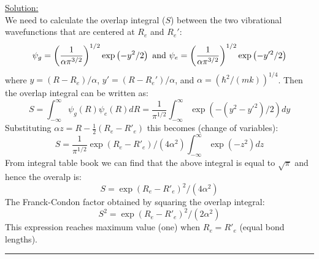 \noindent
\underline{Solution:}\\

\noindent
We need to calculate the overlap integral ($S$) between the two vibrational wavefunctions that are centered at $R_e$ and $R_e'$:
$$\psi_g = \left(\frac{1}{\alpha\pi^{3/2}}\right)^{1/2}\exp\left(-y^2/2\right)\textnormal{ and }\psi_e = \left(\frac{1}{\alpha\pi^{3/2}}\right)^{1/2}\exp\left(-y'^2/2\right)$$
where $y = (R - R_e)/\alpha$, $y' = (R - R_e')/\alpha$, and $\alpha = \left(\hbar^2/(mk)\right)^{1/4}$. Then the overlap integral
can be written as:
$$S = \int_{-\infty}^{\infty}\psi_g(R)\psi_e(R)dR = \frac{1}{\pi^{1/2}}\int_{-\infty}^{\infty}\exp\left(-(y^2-y'^2)/2\right)dy$$
Substituting $\alpha z = R - \frac{1}{2}\left(R_e - R'_e\right)$ this becomes (change of variables):
$$S = \frac{1}{\pi^{1/2}}\exp\left(R_e-R'_e\right)/(4\alpha^2)\int_{-\infty}^{\infty}\exp\left(-z^2\right)dz$$
From integral table book we can find that the above integral is equal to $\sqrt{\pi}$ and hence the overalp is:
$$S = \exp\left(R_e - R'_e\right)^2/(4\alpha^2)$$
The Franck-Condon factor obtained by squaring the overlap integral:
$$S^2 = \exp\left(R_e - R'_e\right)^2/(2\alpha^2)$$
This expression reaches maximum value (one) when $R_e = R'_e$ (equal bond lengths).
\hrule\vspace{0.5cm}



